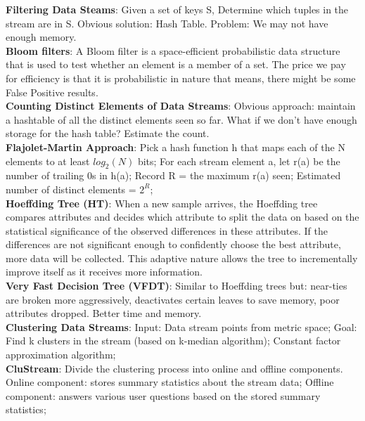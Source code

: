 \documentclass[a4paper,7pt,landscape]{extarticle}
\begin{document}
\begin{multicols}{3}
\begin{boxA}
\textbf{Filtering Data Steams}: Given a set of keys S, Determine which tuples in the stream are in S. Obvious solution: Hash Table. Problem: We may not have enough memory.\\
\textbf{Bloom filters}: A Bloom filter is a space-efficient probabilistic data structure that is used to test whether an element is a member of a set. The price we pay for efficiency is that it is probabilistic in nature that means, there might be some False Positive results.\\
\textbf{Counting Distinct Elements of Data Streams}: Obvious approach: maintain a hashtable of all the distinct elements seen so far. What if we don't have enough storage for the hash table? Estimate the count.\\
\textbf{Flajolet-Martin Approach}: Pick a hash function h that maps each of the N elements to at least $log_2(N)$ bits; For each stream element a, let r(a) be the number of trailing 0s in h(a); Record R = the maximum r(a) seen; Estimated number of distinct elements = $2^R$;\\
\textbf{Hoeffding Tree (HT)}: When a new sample arrives, the Hoeffding tree compares attributes and decides which attribute to split the data on based on the statistical significance of the observed differences in these attributes. If the differences are not significant enough to confidently choose the best attribute, more data will be collected. This adaptive nature allows the tree to incrementally improve itself as it receives more information.\\
\textbf{Very Fast Decision Tree (VFDT)}: Similar to Hoeffding trees but: near-ties are broken more aggressively, deactivates certain leaves to save memory, poor attributes dropped. Better time and memory.\\
\textbf{Clustering Data Streams}: Input: Data stream points from metric space; Goal: Find k clusters in the stream (based on k-median algorithm); Constant factor approximation algorithm;\\
\textbf{CluStream}: Divide the clustering process into online and offline components. Online component: stores summary statistics about the stream data; Offline component: answers various user questions based on the stored summary statistics;
\end{boxA}


\end{multicols}
\end{document}
